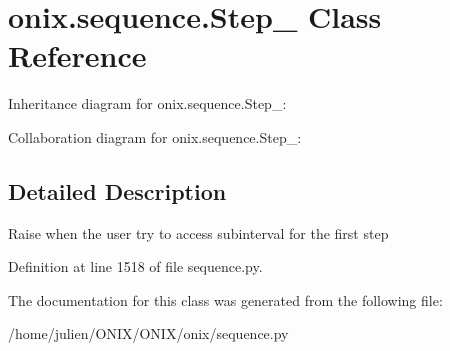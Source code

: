 \hypertarget{classonix_1_1sequence_1_1Step__0}{}\section{onix.\+sequence.\+Step\+\_ Class Reference}
\label{classonix_1_1sequence_1_1Step__0}


Inheritance diagram for onix.\+sequence.\+Step\+\_\+:


Collaboration diagram for onix.\+sequence.\+Step\+\_\+:


\subsection{Detailed Description}
\begin{DoxyVerb}Raise when the user try to access subinterval for the first step\end{DoxyVerb}
 

Definition at line 1518 of file sequence.\+py.



The documentation for this class was generated from the following file\+:\begin{DoxyCompactItemize}
\item 
/home/julien/\+O\+N\+I\+X/\+O\+N\+I\+X/onix/sequence.\+py\end{DoxyCompactItemize}
